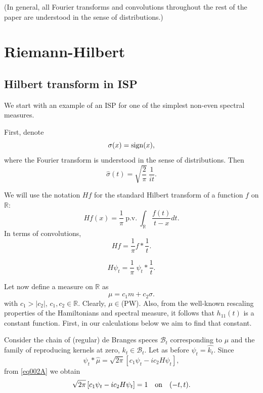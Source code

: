 \documentclass[11pt,twoside,reqno]{amsart}
\def\ms{\bigskip}
\def\ms{\medskip}
\def\R{{\mathbb R}}
\def\BB{{\mathcal B}}
\theoremstyle{plain}
\numberwithin{equation}{section}
\begin{document}
(In general, all Fourier transforms and convolutions throughout the rest of the paper are understood in the sense of distributions.)






\section{Riemann-Hilbert}\label{RH}





\ms \subsection{Hilbert transform in ISP} 
We start with an example of an ISP for one of the simplest non-even spectral measures. 

First,
denote
$$\sigma (x)={\rm sign}(x),$$
where the Fourier transform is understood in the sense of distributions.
Then 
$$\hat\sigma(t)=\sqrt{\frac 2\pi}~\frac 1{it}.$$


We will use the notation $Hf$ for the standard Hilbert transform of a function $f$ on $\R$:
$$Hf(x)=\frac 1\pi~\text{p.v.}~\int_{\R}\frac {f(t)}{t-x}dt.$$
	In terms of convolutions,
	$$Hf=\frac 1\pi f\ast \frac 1t.$$
	
$$H\psi_t=\frac1\pi~\psi_t\ast\frac1t.$$

 Let now define a measure on $\R$ as
\begin{equation}\mu=c_1m+c_2\sigma.\label{eq005}\end{equation}
with $c_1>|c_2|$, $c_1,c_2\in \mathbb R$. Clearly, $\mu\in$(PW).  Also, from the well-known rescaling properties of the Hamiltonians
and spectral measure, it follows  that $h_{11}(t)$ is a constant function. First, in our calculations below we aim to find that constant.

Consider the  chain of (regular) de Branges speces $\BB_t$ corresponding to $\mu$ and the family of reproducing kernels  at zero, $k_t\in\BB_t$.
Let as before $\psi_t=\hat{k_t}$.
Since
$$\psi_t\ast\hat\mu=\sqrt{2\pi}\left[c_1\psi_t-ic_2H\psi_t\right],$$
from \eqref{eq002A} we obtain
$$\sqrt{2\pi}\left[c_1\psi_t-ic_2H\psi_t\right]=1\quad {\rm on}\quad(-t,t).$$
\end{document}
